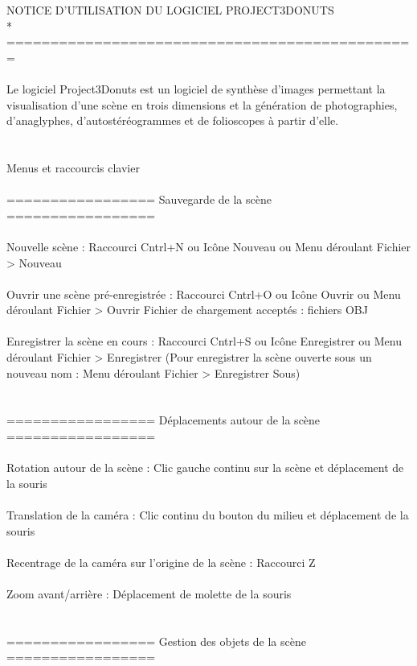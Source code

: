 NOTICE D'UTILISATION DU LOGICIEL PROJECT3DONUTS\\*
===============================================
\\ \\
Le logiciel Project3Donuts est un logiciel de synthèse d'images permettant la visualisation d'une scène en trois dimensions et la génération de photographies, d'anaglyphes, d'autostéréogrammes et de folioscopes à partir d'elle.
\\ \\ \\
Menus et raccourcis clavier
\\ \\
================= Sauvegarde de la scène =================
\\ \\
Nouvelle scène :			Raccourci Cntrl+N     
	       	 			ou     Icône Nouveau     
		 			ou     Menu déroulant Fichier > Nouveau
\\ \\
Ouvrir une scène pré-enregistrée : 	Raccourci Cntrl+O
       	   	 		   	ou      Icône Ouvrir
				   	ou	Menu déroulant Fichier > Ouvrir
		Fichier de chargement acceptés : fichiers OBJ
\\ \\
Enregistrer la scène en cours :       	Raccourci Cntrl+S
	       	     	      		ou 	Icône Enregistrer
					ou 	Menu déroulant Fichier > Enregistrer
		(Pour enregistrer la scène ouverte sous un nouveau nom : Menu déroulant Fichier > Enregistrer Sous)
\\ \\ \\
================= Déplacements autour de la scène =================
\\ \\
Rotation autour de la scène :  	        Clic gauche continu sur la scène et déplacement de la souris
\\ \\
Translation de la caméra :                    Clic continu du bouton du milieu et déplacement de la souris
\\ \\
Recentrage de la caméra sur 
	l'origine de la scène : 			Raccourci Z
\\ \\
Zoom avant/arrière :  	    		Déplacement de molette de la souris
\\ \\ \\
================= Gestion des objets de la scène =================
